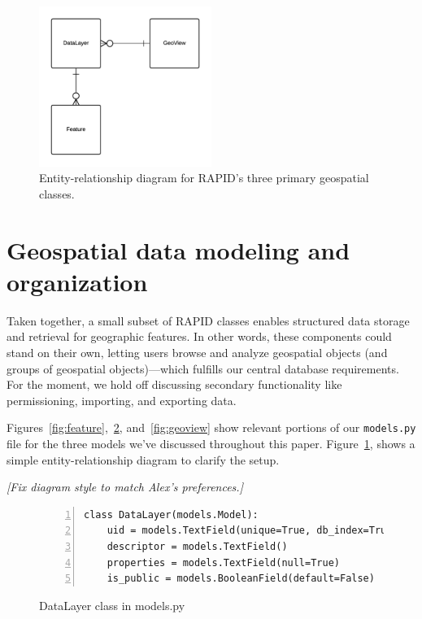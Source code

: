 \begin{figure}[ht]
    \centering
    \includegraphics[width=0.5\textwidth]{figures/3er.png}
    \caption{Entity-relationship diagram for RAPID's three primary geospatial classes.}
    \label{fig:3er}
\end{figure}

\section{Geospatial data modeling and organization}
Taken together, a small subset of RAPID classes enables structured data storage and retrieval for geographic features. In other words, these components could stand on their own, letting users browse and analyze geospatial objects (and groups of geospatial objects)---which fulfills our central database requirements. For the moment, we hold off discussing secondary functionality like permissioning, importing, and exporting data.

Figures~\ref{fig:feature},~\ref{fig:datalayer}, and~\ref{fig:geoview} show relevant portions of our \texttt{models.py} file for the three models we've discussed throughout this paper. Figure~\ref{fig:3er}, shows a simple entity-relationship diagram to clarify the setup. 

\textit{[Fix diagram style to match Alex's preferences.]}


\begin{figure}[ht]
\begin{Verbatim}[samepage=true,baselinestretch=1,numbers=left,xleftmargin=12mm]
class DataLayer(models.Model):
    uid = models.TextField(unique=True, db_index=True)
    descriptor = models.TextField()
    properties = models.TextField(null=True)
    is_public = models.BooleanField(default=False)
\end{Verbatim}
\caption{DataLayer class in models.py}
\label{fig:datalayer}
\end{figure}

